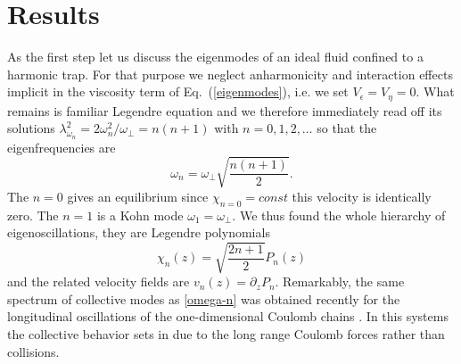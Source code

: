 \section{Results}
As the first step let us discuss the eigenmodes of an ideal fluid confined to a harmonic trap. For that purpose we neglect anharmonicity and interaction effects implicit in the viscosity term of Eq.~(\ref{eigenmodes}), i.e. we set $V_{\epsilon} =V_{\eta}=0$. 
What remains is familiar Legendre equation and we therefore immediately read off its solutions $\lambda^2_{\omega_n}=2\omega^2_n/\omega_\perp=n(n+1)$ with $n=0,1,2,\ldots$ so that the eigenfrequencies are 
\begin{equation}\label{omega-n}
 \omega_n=\omega_\perp\sqrt{\frac{n(n+1)}{2}}. 
\end{equation}
The $n=0$ gives an equilibrium since $\chi_{n=0}=const$ this velocity is identically zero. The $n=1$ is a Kohn mode $\omega_1=\omega_\perp$. We thus found the whole hierarchy of eigenoscillations, they are Legendre polynomials 
\begin{equation}\label{chi}
\chi_n(z)=\sqrt{\frac{2n+1}{2}}P_n(z)
\end{equation} 
and the related velocity fields are $v_n(z)=\partial_zP_n$. 
Remarkably, the same spectrum of collective modes as \eqref{omega-n} was obtained recently for the longitudinal oscillations of the one-dimensional Coulomb chains \cite{Morigi_PRE}.
In this systems the collective behavior sets in due to the long range Coulomb forces rather than collisions.

